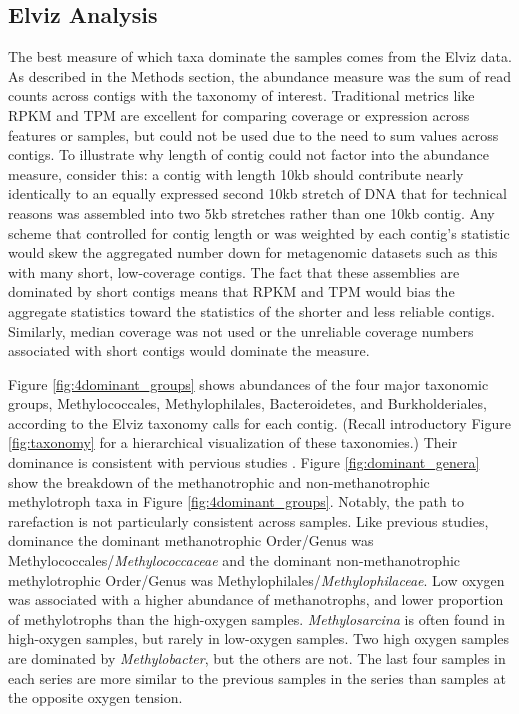 \subsection{Elviz Analysis}

The best measure of which taxa dominate the samples comes from the Elviz \cite{cantor2015} data.
As described in the Methods section, the abundance measure was the sum of read counts across contigs with the taxonomy of interest.
Traditional metrics like RPKM \cite{mortazavi2008} and TPM \cite{wagner2012} are excellent for comparing coverage or expression across features or samples, but could not be used due to the need to sum values across contigs.
To illustrate why length of contig could not factor into the abundance measure, consider this:
a contig with length 10kb should contribute nearly identically to an equally expressed second 10kb stretch of DNA that for technical reasons was assembled into two 5kb stretches rather than one 10kb contig.
Any scheme that controlled for contig length or was weighted by each contig's statistic would skew the aggregated number down for metagenomic datasets such as this with many short, low-coverage contigs.
The fact that these assemblies are dominated by short contigs means that RPKM and TPM would bias the aggregate statistics toward the statistics of the shorter and less reliable contigs.
Similarly, median coverage was not used or the unreliable coverage numbers associated with short contigs would dominate the measure.

Figure \ref{fig:4dominant_groups} shows abundances of the four major taxonomic groups, Methylococcales, Methylophilales, Bacteroidetes, and Burkholderiales, according to the Elviz taxonomy calls for each contig. %
(Recall introductory Figure \ref{fig:taxonomy} for a hierarchical visualization of these taxonomies.)
Their dominance is consistent with pervious studies \cite{beck2013LW, beck2014LW, oshkin2015LW, hernandez2015LW, kalyuzhnaya2008Burkholderiales}.
Figure \ref{fig:dominant_genera} show the breakdown of the methanotrophic and non-methanotrophic methylotroph taxa in Figure \ref{fig:4dominant_groups}.
Notably, the path to rarefaction is not particularly consistent across samples.
Like previous studies, dominance the dominant methanotrophic Order/Genus was Methylococcales/\textit{Methylococcaceae} and the dominant non-methanotrophic methylotrophic Order/Genus was Methylophilales/\textit{Methylophilaceae}.
Low oxygen was associated with a higher abundance of methanotrophs, and lower proportion of methylotrophs than the high-oxygen samples.
\textit{Methylosarcina} is often found in high-oxygen samples, but rarely in low-oxygen samples.
Two high oxygen samples are dominated by \textit{Methylobacter}, but the others are not.
The last four samples in each series are more similar to the previous samples in the series than samples at the opposite oxygen tension.


